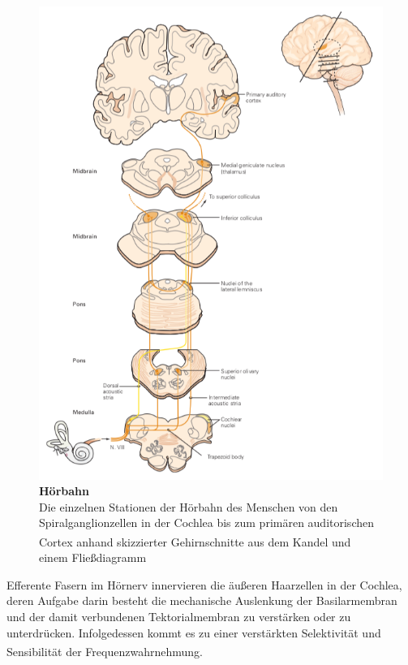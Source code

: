 \documentclass[12pt,a4paper,pdftex]{article}
\begin{document}
\begin{figure}[H]
    \centering
    \includegraphics{pictures/auditory/hoerbahn_pathway.png}
    \caption[Hörbahn]{\textbf{Hörbahn} \\
    Die einzelnen Stationen der Hörbahn des Menschen von den Spiralganglionzellen in der Cochlea bis zum primären auditorischen Cortex anhand skizzierter Gehirnschnitte aus dem Kandel\textsuperscript{\cite[30]{kandel2013principles}} und einem Fließdiagramm}
    \label{fig:hoerbahn_pathway}
\end{figure}

\newpage
\noindent Efferente Fasern im Hörnerv innervieren die äußeren Haarzellen in der Cochlea, deren Aufgabe darin besteht die mechanische Auslenkung der Basilarmembran und der damit verbundenen Tektorialmembran zu verstärken oder zu unterdrücken. Infolgedessen kommt es zu einer verstärkten Selektivität und Sensibilität der Frequenzwahrnehmung\textsuperscript{\cite[29]{paxinos2014rat}}.
\end{document}
